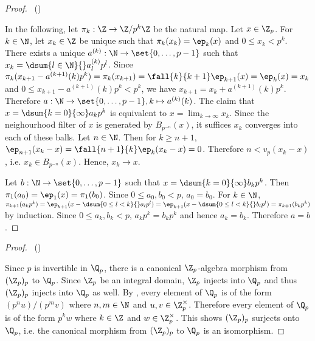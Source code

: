 \begin{proof}~()

  In the following, let $\pi_k : \Z \to \Z/p^k\Z$ be the natural map. 
  Let $x \in \Z_p$. 
  For $k \in \N$, let $x_k \in \Z$ be unique such that 
  $\pi_k(x_k) = \ep_k(x)$ and $0 \leq x_k < p^k$. 
  There exists a unique $a^{(k)} : \N \to \set{0,\dots,p-1}$ such that 
  $x_k = \dsum{l\in\N}{} a^{(k)}_l p^l$. 
  Since $\pi_k(x_{k+1} - a^{(k+1)}(k) p^k) = \pi_k(x_{k+1})
  = \fall{k}{k+1}\ep_{k+1}(x) = \ep_k(x) = x_k$
  and $0 \leq x_{k+1} - a^{(k+1)}(k) p^k < p^k$,
  we have $x_{k+1} = x_k + a^{(k+1)}(k) p^k$.
  Therefore $a : \N \to \set{0,\dots,p-1}, k \mapsto a^{(k)}(k)$. 
  The claim that $x = \dsum{k = 0}{\infty} a_k p^k$
  is equivalent to $x = \lim_{k \to \infty} x_k$. 
  Since the neighourhood filter of $x$ is generated by $B_{p^{-n}}(x)$,
  it suffices $x_k$ converges into each of these balls. 
  Let $n \in \N$. 
  Then for $k \geq n + 1$, 
  $\ep_{n+1}(x_k - x) = \fall{n+1}{k}\ep_k(x_k - x) = 0$.
  Therefore $n < v_p(x_k - x)$, i.e. $x_k \in B_{p^{-n}}(x)$.
  Hence, $x_k \to x$. 

  Let $b : \N \to \set{0,\dots,p-1}$ such that 
  $x = \dsum{k = 0}{\infty} b_kp^k$.
  Then $\pi_1(a_0) = \ep_1(x) = \pi_1(b_0)$.
  Since $0 \leq a_0,b_0 < p$, $a_0 = b_0$. 
  For $k \in \N$, 
  $\pi_{k+1}(a_{k}p^{k}) = \ep_{k+1}(x - \dsum{0 \leq l < k}{}a_lp^l)
  = \ep_{k+1}(x - \dsum{0 \leq l < k}{}b_lp^l) = \pi_{k+1}(b_{k}p^{k})$
  by induction.
  Since $0 \leq a_k, b_k < p$, $a_k p^k = b_k p^k$ and hence $a_k = b_k$.
  Therefore $a = b$. 
\end{proof}

\begin{proof}~()
  
  Since $p$ is invertible in $\Q_p$, 
  there is a canonical $\Z_p$-algebra morphism from $(\Z_p)_p$ to $\Q_p$.
  Since $\Z_p$ be an integral domain, 
  $\Z_p$ injects into $\Q_p$ and thus $(\Z_p)_p$ injects into $\Q_p$ as well.
  By ,
  every element of $\Q_p$ is of the form $(p^nu)/(p^m v)$ where 
  $n, m \in \N$ and $u, v \in \Z_p^\times$. 
  Therefore every element of $\Q_p$ is of the form $p^k w$
  where $k \in \Z$ and $w \in \Z_p^\times$. 
  This shows $(\Z_p)_p$ surjects onto $\Q_p$,
  i.e. the canonical morphism from $(\Z_p)_p$ to $\Q_p$ is an isomorphism.
\end{proof}

